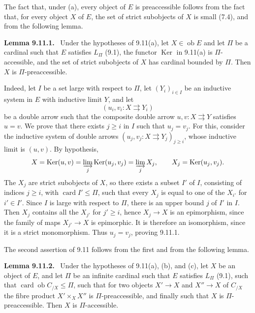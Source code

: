 \documentclass[11pt]{article}
\newcommand{\ob}{\operatorname{ob}}
\newcommand{\Ker}{\operatorname{Ker}}
\newcommand{\card}{\operatorname{card}}
\newenvironment{statement}[1]{\par\medskip\noindent\textbf{#1.}\ }{\par\medskip}
\begin{document}
The fact that, under (a), every object of $E$ is preaccessible follows from the fact that, for every object $X$ of $E$, the set of strict subobjects of $X$ is small (7.4), and from the following lemma.

\begin{statement}{Lemma 9.11.1}
Under the hypotheses of 9.11(a), let $X\in\ob E$ and let $\Pi$ be a cardinal such that $E$ satisfies $L_\Pi$ (9.1), the functor $\Ker$ in 9.11(a) is $\Pi$-accessible, and the set of strict subobjects of $X$ has cardinal bounded by $\Pi$. Then $X$ is $\Pi$-preaccessible.
\end{statement}

Indeed, let $I$ be a set large with respect to $\Pi$, let $(Y_i)_{i\in I}$ be an inductive system in $E$ with inductive limit $Y$, and let
\[
 (u_i,v_i:X\rightrightarrows Y_i)
\]
be a double arrow such that the composite double arrow $u,v:X\rightrightarrows Y$ satisfies $u=v$. We prove that there exists $j\geq i$ in $I$ such that $u_j=v_j$. For this, consider the inductive system of double arrows $(u_j,v_j:X\rightrightarrows Y_j)_{j\geq i}$, whose inductive limit is $(u,v)$. By hypothesis,
\[
 X=\Ker(u,v)=\varinjlim_j \Ker(u_j,v_j)=\varinjlim_j X_j,
 \qquad X_j=\Ker(u_j,v_j).
\]
The $X_j$ are strict subobjects of $X$, so there exists a subset $I'$ of $I$, consisting of indices $j\geq i$, with $\card I'\leq\Pi$, such that every $X_j$ is equal to one of the $X_{i'}$ for $i'\in I'$. Since $I$ is large with respect to $\Pi$, there is an upper bound $j$ of $I'$ in $I$. Then $X_j$ contains all the $X_{j'}$ for $j'\geq i$, hence $X_j\to X$ is an epimorphism, since the family of maps $X_{j'}\to X$ is epimorphic. It is therefore an isomorphism, since it is a strict monomorphism. Thus $u_j=v_j$, proving 9.11.1.

The second assertion of 9.11 follows from the first and from the following lemma.

\begin{statement}{Lemma 9.11.2}
Under the hypotheses of 9.11(a), (b), and (c), let $X$ be an object of $E$, and let $\Pi$ be an infinite cardinal such that $E$ satisfies $L_\Pi$ (9.1), such that $\card\ob C_{/X}\leq\Pi$, such that for two objects $X'\to X$ and $X''\to X$ of $C_{/X}$ the fibre product $X'\times_X X''$ is $\Pi$-preaccessible, and finally such that $X$ is $\Pi$-preaccessible. Then $X$ is $\Pi$-accessible.
\end{statement}
\end{document}
